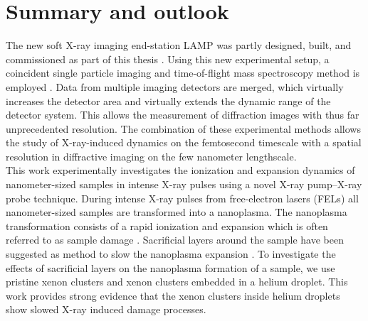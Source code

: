 \chapter{Summary and outlook}\label{ch:summary_outlook}
%
The new soft X-ray imaging end-station LAMP was partly designed, built, and commissioned as part of this thesis \citep{Ferguson-2015-JSR}. Using this new experimental setup, a coincident single particle imaging and time-of-flight mass spectroscopy method is employed \cite{Gorkhover-2012-PRL}. Data from multiple imaging detectors are merged, which virtually increases the detector area and virtually extends the dynamic range of the detector system. This allows the measurement of diffraction images with thus far unprecedented resolution. The combination of these experimental methods allows the study of X-ray-induced dynamics on the femtosecond timescale with a spatial resolution in diffractive imaging on the few nanometer lengthscale.\\[1\baselineskip]
This work experimentally investigates the ionization and expansion dynamics of nanometer-sized samples in intense X-ray pulses using a novel X-ray pump--X-ray probe technique. During intense X-ray pulses from free-electron lasers (FELs) all nanometer-sized samples are transformed into a nanoplasma. The nanoplasma transformation consists of a rapid ionization and expansion which is often referred to as sample damage \cite{Neutze-2000-Nature,Arbeiter-2011-NJP}. Sacrificial layers around the sample have been suggested as method to slow the nanoplasma expansion \cite{Hau-Riege-2007-PRL,Hau-Riege-2010-PRL}. To investigate the effects of sacrificial layers on the nanoplasma formation of a sample, we use pristine xenon clusters and xenon clusters embedded in a helium droplet. This work provides strong evidence that the xenon clusters inside helium droplets show slowed X-ray induced damage processes.\\[2\baselineskip]
